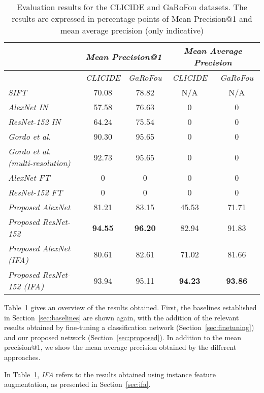 \begin{table}
\begin{tabular}{|l|c|c|c|c|}
\hline & \multicolumn{2}{c|}{\emph{Mean Precision@1}} &
\multicolumn{2}{c|}{\emph{Mean Average Precision}}\\
\hline & \emph{CLICIDE} & \emph{GaRoFou} & \emph{CLICIDE} & \emph{GaRoFou}\\
\hline \emph{SIFT} & 70.08 & 78.82 & N/A & N/A\\
\hline \emph{AlexNet IN} & 57.58 & 76.63 & 0 & 0\\
\hline \emph{ResNet-152 IN} & 64.24 & 75.54 & 0 & 0\\
\hline \emph{Gordo et al.~\cite{gordo_deep_2016}}
& 90.30 & 95.65 & 0 & 0\\
\hline \emph{Gordo et al.~\cite{gordo_deep_2016} (multi-resolution)}
& 92.73 & 95.65 & 0 & 0\\
\hline \emph{AlexNet FT} & 0 & 0 & 0 & 0\\ %
\hline \emph{ResNet-152 FT} & 0 & 0 & 0 & 0\\
\hline \emph{Proposed AlexNet} & 81.21 & 83.15 & 45.53 & 71.71\\ %
\hline \emph{Proposed ResNet-152} & \textbf{94.55} & \textbf{96.20} & 82.94 & 91.83\\
\hline \emph{Proposed AlexNet (IFA)} & 80.61 & 82.61 & 71.02 & 81.66\\ %
\hline \emph{Proposed ResNet-152 (IFA)} & 93.94 & 95.11 & \textbf{94.23} & \textbf{93.86}\\
\hline
\end{tabular}
\caption{Evaluation results for the CLICIDE and GaRoFou datasets.
The results are expressed in percentage points of
Mean Precision@1 and mean average precision (only indicative)
\label{tab:results}}
\end{table}

Table~\ref{tab:results} gives an overview of the results obtained. First,
the baselines established in Section~\ref{sec:baselines} are shown
again, with the addition of the relevant results obtained by fine-tuning
a classification network (Section~\ref{sec:finetuning}) and our
proposed network (Section~\ref{sec:proposed}).
In addition to the mean precision@1, we show the mean average
precision obtained by the different approaches.

In Table~\ref{tab:results}, \emph{IFA} refers to the results obtained
using instance feature augmentation, as presented in Section~\ref{sec:ifa}.

